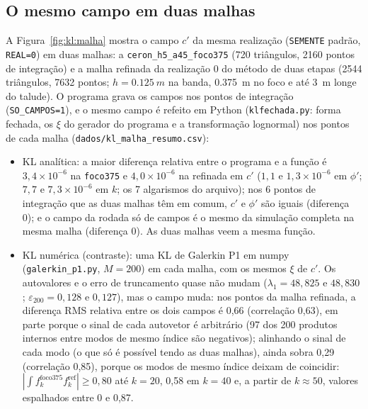 

\subsection{O mesmo campo em duas malhas}

A Figura~\ref{fig:kl:malha} mostra o campo $c'$ da mesma realização (\texttt{SEMENTE} padrão, \texttt{REAL=0}) em duas
malhas: a \texttt{ceron\_h5\_a45\_foco375} (720 triângulos, 2160 pontos de integração) e a malha refinada da realização 0
do método de duas etapas (2544 triângulos, 7632 pontos; $h = \SI{0.125}{m}$ na banda, \SI{0.375}{m} no foco e até
\SI{3}{m} longe do talude). O programa grava os campos nos pontos de integração (\texttt{SO\_CAMPOS=1}), e o mesmo campo
é refeito em Python (\texttt{klfechada.py}: forma fechada, os $\xi$ do gerador do programa e a transformação lognormal)
nos pontos de cada malha (\texttt{dados/kl\_malha\_resumo.csv}):
\begin{itemize}
  \item KL analítica: a maior diferença relativa entre o programa e a função é $3{,}4 \times 10^{-6}$ na
    \texttt{foco375} e $4{,}0 \times 10^{-6}$ na refinada em $c'$ ($1{,}1$ e $1{,}3 \times 10^{-6}$ em $\phi'$; $7{,}7$ e $7{,}3 \times 10^{-6}$ em $k$; os 7 algarismos do arquivo); nos 6
    pontos de integração que as duas malhas têm em comum, $c'$ e $\phi'$ são iguais (diferença 0); e o campo da rodada
    só de campos é o mesmo da simulação completa na mesma malha (diferença 0). As duas malhas veem a mesma função.
  \item KL numérica (contraste): uma KL de Galerkin P1 em numpy (\texttt{galerkin\_p1.py}, $M = 200$) em cada malha, com
    os mesmos $\xi$ de $c'$. Os autovalores e o erro de truncamento quase não mudam ($\lambda_1 = 48{,}825$ e $48{,}830$;
    $\varepsilon_{200} = 0{,}128$ e $0{,}127$), mas o campo muda: nos pontos da malha refinada, a diferença RMS relativa
    entre os dois campos é 0,66 (correlação 0,63), em parte porque o sinal de cada autovetor é arbitrário (97 dos 200
    produtos internos entre modos de mesmo índice são negativos); alinhando o sinal de cada modo (o que só é possível
    tendo as duas malhas), ainda sobra 0,29 (correlação 0,85), porque os modos de mesmo índice deixam de coincidir: $|\int f_k^{\mathrm{foco375}} f_k^{\mathrm{ref}}| \ge 0{,}80$ até $k = 20$,
    0,58 em $k = 40$ e, a partir de $k \approx 50$, valores espalhados entre 0 e 0,87.
\end{itemize}

